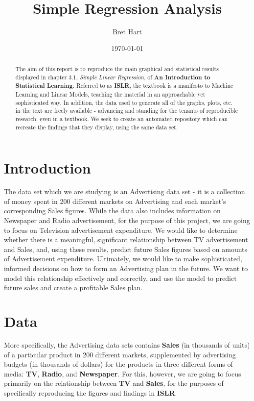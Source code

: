 \documentclass{article}
\title{Simple Regression Analysis}
\author{Bret Hart}
\date{\today}
\begin{document}

\maketitle






\begin{abstract}

The aim of this report is to reproduce the main graphical and statistical results displayed in chapter 3.1, \textit{Simple Linear Regression}, of \textbf{An Introduction to Statistical Learning}. Referred to as \textbf{ISLR}, the textbook is a manifesto to Machine Learning and Linear Models, teaching the material in an approachable yet sophisticated way. In addition, the data used to generate all of the graphs, plots, etc. in the text are freely available - advancing and standing for the tenants of reproducible research, even in a textbook. We seek to create an automated repository which can recreate the findings that they display, using the same data set.

\end{abstract}

\section*{Introduction}

The data set which we are studying is an Advertising data set - it is a collection of money spent in 200 different markets on Advertising and each market's corresponding Sales figures. While the data also includes information on Newspaper and Radio advertisement, for the purpose of this project, we are going to focus on Television advertisement expenditure. We would like to determine whether there is a meaningful, significant relationship between TV advertisement and Sales, and, using these results, predict future Sales figures based on amounts of Advertisement expenditure. Ultimately, we would like to make sophisticated, informed decisions on how to form an Advertising plan in the future. We want to model this relationship effectively and correctly, and use the model to predict future sales and create a profitable Sales plan.


\section*{Data}

More specifically, the Advertising data sets contains \textbf{Sales} (in thousands of units) of a particular product in 200 different markets, supplemented by advertising budgets (in thousands of dollars) for the products in three different forms of media: \textbf{TV}, \textbf{Radio}, and \textbf{Newspaper}. For this, however, we are going to focus primarily on the relationship between \textbf{TV} and \textbf{Sales}, for the purposes of specifically reproducing the figures and findings in \textbf{ISLR}.
\end{document}
